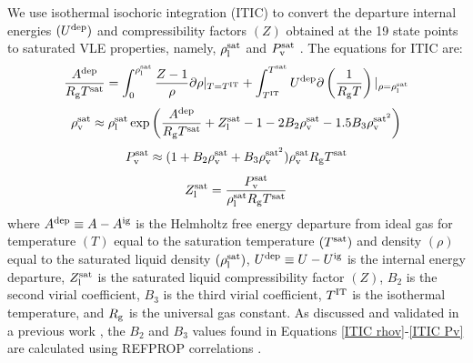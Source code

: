 \documentclass[journal=jctc,manuscript=article]{achemso}
\begin{document}
We use isothermal isochoric integration (ITIC) to convert the departure internal energies $(U^{\rm dep})$ and compressibility factors $(Z)$ obtained at the 19 state points to saturated VLE properties, namely, $\rho_{\rm l}^{\rm sat}$ and $P_{\rm v}^{\rm sat}$ \cite{Mostafa_Diss,Postdoc_1}.
The 
equations for ITIC are: 
\begin{equation} \label{ITIC A}
\frac{A^{\rm dep}}{R_{\rm g}T^{\rm sat}} = \int_{0}^{\rho_{\rm l}^{\rm sat}}\frac{Z-1}{\rho} \partial \rho |_{T = T^{\rm IT}} + \int_{T^{\rm IT}}^{T^{\rm sat}}U^{\rm dep}\partial\left(\frac{1}{R_{\rm g}T}\right)|_{\rho=\rho_{\rm l}^{\rm sat}}
\end{equation}
\begin{equation} \label{ITIC rhov}
\rho_{\rm v}^{\rm sat} \approx \rho_{\rm l}^{\rm sat} \exp \left( \frac{A^{\rm dep}}{R_{\rm g}T^{\rm sat}} + Z_{\rm l}^{\rm sat} - 1 - 2 B_2 \rho_{\rm v}^{\rm sat} - 1.5 B_3 \rho_{\rm v}^{\rm sat^2} \right)
\end{equation}
\begin{equation} \label{ITIC Pv}
P_{\rm v}^{\rm sat} \approx (1 + B_2 \rho_{\rm v}^{\rm sat} + B_3 \rho_{\rm v}^{\rm sat^2})\rho_{\rm v}^{\rm sat} R_{\rm g}T^{\rm sat}
\end{equation}
\begin{equation} \label{ITIC Zl}
Z_{\rm l}^{\rm sat} = \frac{P_{\rm v}^{\rm sat}}{\rho_{\rm l}^{\rm sat} R_{\rm g} T^{\rm sat}}
\end{equation}
where $A^{\rm dep} \equiv A-A^{\rm ig}$ is the Helmholtz free energy departure from ideal gas for temperature $(T)$ equal to the saturation temperature $(T^{\rm sat})$ and density $(\rho)$ equal to the saturated liquid density $(\rho_{\rm l}^{\rm sat})$, $U^{\rm dep} \equiv U-U^{\rm ig}$ is the internal energy departure, $Z_{\rm l}^{\rm sat}$ is the saturated liquid compressibility factor $(Z)$, $B_2$ is the second virial coefficient, $B_3$ is the third virial coefficient, $T^{\rm IT}$ is the isothermal temperature, and $R_{\rm g}$ is the universal gas constant. As discussed and validated in a previous work \cite{Postdoc_1}, the $B_2$ and $B_3$ values found in Equations \ref{ITIC rhov}-\ref{ITIC Pv} are calculated using REFPROP correlations \cite{LEMMON-RP91}. 
\end{document}
